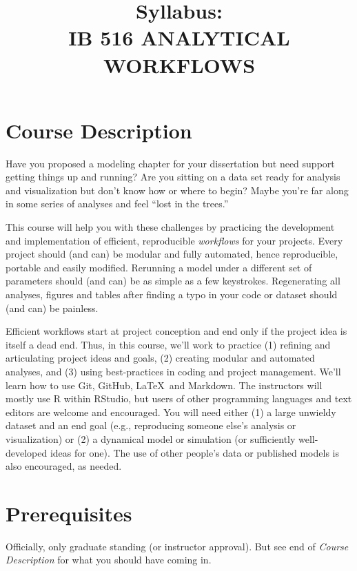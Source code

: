 \documentclass[10pt]{article}
\title{Syllabus:\\IB 516 ANALYTICAL WORKFLOWS}
\author{}
\date{}
\begin{document}
\maketitle
\vspace{-50pt}


\section*{Course Description}
	Have you proposed a modeling chapter for your dissertation but need support getting things up and
	running?
	Are you sitting on a data set ready for analysis and visualization but don't know how or
	where to begin?
	Maybe you're far along in some series of analyses and feel ``lost in the trees.''

	This course will help you with these challenges by practicing the development and implementation of
	efficient, reproducible \emph{workflows} for your projects.
	Every project should (and can) be modular and fully automated, hence reproducible, portable and
	easily modified.
	Rerunning a model under a different set of parameters should (and can) be as simple as a few
	keystrokes.
	Regenerating all analyses, figures and tables after finding a typo in your code or dataset should (and
	can) be painless.

	Efficient workflows start at project conception and end only if the project idea is itself a dead end.
	Thus, in this course, we'll work to practice
	(1) refining and articulating project ideas and goals,
	(2) creating modular and automated analyses, and
	(3) using best-practices in coding and project management.
	We'll learn how to use Git, GitHub, \LaTeX\, and Markdown.
	The instructors will mostly use \textsf{R} within RStudio, but users of other programming languages
	and text editors are welcome and encouraged.
	You will need either
	(1) a large unwieldy dataset and an end goal (e.g., reproducing someone else's analysis or
	visualization) or
	(2) a dynamical model or simulation (or sufficiently well-developed ideas for one).
	The use of other people's data or published models is also encouraged, as needed.

\section*{Prerequisites}
\noindent
	Officially, only graduate standing (or  instructor approval).
	But see end of \emph{Course Description} for what you should have coming in.
\end{document}
